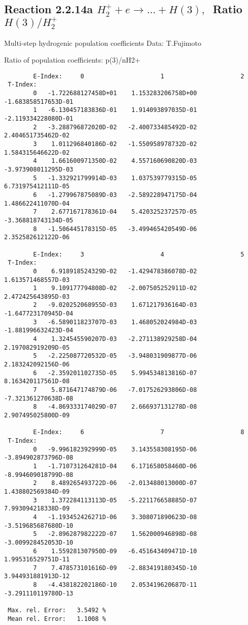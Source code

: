 \documentclass[12pt]{article}
\begin{document}
\newpage
\subsection{
Reaction 2.2.14a $ H_2^+ + e \rightarrow ...+ H(3) , \  $
Ratio $H(3)/H_2^+ $
}

 Multi-step hydrogenic population coefficients
 Data: T.Fujimoto

 Ratio of population coefficients: p(3)/nH2+


\begin{small}\begin{verbatim}
        E-Index:     0                     1                     2
 T-Index:
        0   -1.722688127458D+01    1.153283206758D+00   -1.683858517653D-01
        1   -6.130457183836D-01    1.914093897035D-01   -2.119334228080D-01
        2   -3.288796872020D-02   -2.400733485492D-02    2.404651735462D-02
        3    1.011296840186D-02   -1.550958978732D-02    1.584315646622D-02
        4    1.661600971350D-02    4.557160690820D-03   -3.973908011295D-03
        5   -1.332921799914D-03    1.037539779315D-05    6.731975412111D-05
        6   -1.279967875089D-03   -2.589228947175D-04    1.486622411070D-04
        7    2.677167178361D-04    5.420325237257D-05   -3.368818743134D-05
        8   -1.506445178315D-05   -3.499465420549D-06    2.352582612122D-06

        E-Index:     3                     4                     5
 T-Index:
        0    6.918918524329D-02   -1.429478386078D-02    1.613571468557D-03
        1    9.109177794808D-02   -2.007505252911D-02    2.472425643895D-03
        2   -9.020252068955D-03    1.671217936164D-03   -1.647723170945D-04
        3   -6.589011823707D-03    1.468052024984D-03   -1.881996632423D-04
        4    1.324545590207D-03   -2.271138929258D-04    2.197082919209D-05
        5   -2.225087720532D-05   -3.948031909877D-06    2.183242092156D-06
        6   -2.359201102735D-05    5.994534813816D-07    8.163420117561D-08
        7    5.871647174879D-06   -7.017526293806D-08   -7.321361270638D-08
        8   -4.869333174029D-07    2.666937131278D-08    2.907495025800D-09

        E-Index:     6                     7                     8
 T-Index:
        0   -9.996182392999D-05    3.143558308195D-06   -3.894902873796D-08
        1   -1.710731264281D-04    6.171658058460D-06   -8.994609018799D-08
        2    8.489265493722D-06   -2.013488013000D-07    1.438802569384D-09
        3    1.372284113113D-05   -5.221176658885D-07    7.993094218338D-09
        4   -1.193452426271D-06    3.308071890623D-08   -3.519685687680D-10
        5   -2.896287982222D-07    1.562000946898D-08   -3.009928452053D-10
        6    1.559281307950D-09   -6.451643409471D-10    1.995316529751D-11
        7    7.478573101616D-09   -2.883419180345D-10    3.944931881913D-12
        8   -4.438182202186D-10    2.053419620687D-11   -3.291110119780D-13

 Max. rel. Error:   3.5492 %
 Mean rel. Error:   1.1008 %


\end{verbatim}\end{small}
\end{document}
